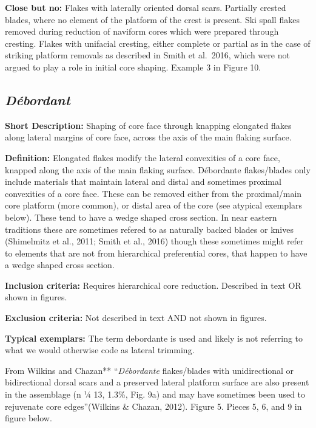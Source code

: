 \documentclass[
]{article}
\begin{document}
\textbf{Close but no:} Flakes with laterally oriented dorsal scars.
Partially crested blades, where no element of the platform of the crest
is present. Ski spall flakes removed during reduction of naviform cores
which were prepared through cresting. Flakes with unifacial cresting,
either complete or partial as in the case of striking platform removals
as described in Smith et al.~2016, which were not argued to play a role
in initial core shaping. Example 3 in Figure 10.

\subsection{\texorpdfstring{\emph{Débordant}}{Débordant}}\label{duxe9bordant}

\textbf{Short Description:} Shaping of core face through knapping
elongated flakes along lateral margins of core face, across the axis of
the main flaking surface.

\textbf{Definition:} Elongated flakes modify the lateral convexities of
a core face, knapped along the axis of the main flaking surface.
Débordante flakes/blades only include materials that maintain lateral
and distal and sometimes proximal convexities of a core face. These can
be removed either from the proximal/main core platform (more common), or
distal area of the core (see atypical exemplars below). These tend to
have a wedge shaped cross section. In near eastern traditions these are
sometimes refered to as naturally backed blades or knives (Shimelmitz et
al., 2011; Smith et al., 2016) though these sometimes might refer to
elements that are not from hierarchical preferential cores, that happen
to have a wedge shaped cross section.

\textbf{Inclusion criteria:} Requires hierarchical core reduction.
Described in text OR shown in figures.

\textbf{Exclusion criteria:} Not described in text AND not shown in
figures.

\textbf{Typical exemplars:} The term debordante is used and likely is
not referring to what we would otherwise code as lateral trimming.

From Wilkins and Chazan** ``\emph{Débordante} flakes/blades with
unidirectional or bidirectional dorsal scars and a preserved lateral
platform surface are also present in the assemblage (n ¼ 13, 1.3\%, Fig.
9a) and may have sometimes been used to rejuvenate core edges''(Wilkins
\& Chazan, 2012). Figure 5. Pieces 5, 6, and 9 in figure below.
\end{document}
